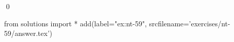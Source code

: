 
\begin{ex} 
  \label{ex:nt-59}
  
  \qed
\end{ex} 
\begin{python0}
from solutions import *
add(label="ex:nt-59",
    srcfilename='exercises/nt-59/answer.tex') 
\end{python0}
